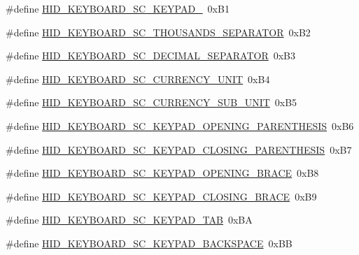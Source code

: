 \begin{DoxyCompactItemize}
\item 
\#define \hyperlink{group__Group__USBClassHIDCommon_ga694fa07e8f7188baef070de3aab4d86e}{H\+I\+D\+\_\+\+K\+E\+Y\+B\+O\+A\+R\+D\+\_\+\+S\+C\+\_\+\+K\+E\+Y\+P\+A\+D\+\_}~0x\+B1
\item 
\#define \hyperlink{group__Group__USBClassHIDCommon_gac6f7e2544c7742d3019f0f5a4cdfc398}{H\+I\+D\+\_\+\+K\+E\+Y\+B\+O\+A\+R\+D\+\_\+\+S\+C\+\_\+\+T\+H\+O\+U\+S\+A\+N\+D\+S\+\_\+\+S\+E\+P\+A\+R\+A\+T\+OR}~0x\+B2
\item 
\#define \hyperlink{group__Group__USBClassHIDCommon_gabd7bf746f597db6306eefb131a3a6b7b}{H\+I\+D\+\_\+\+K\+E\+Y\+B\+O\+A\+R\+D\+\_\+\+S\+C\+\_\+\+D\+E\+C\+I\+M\+A\+L\+\_\+\+S\+E\+P\+A\+R\+A\+T\+OR}~0x\+B3
\item 
\#define \hyperlink{group__Group__USBClassHIDCommon_ga4c3ec6b6de28e6829acfada9655a65df}{H\+I\+D\+\_\+\+K\+E\+Y\+B\+O\+A\+R\+D\+\_\+\+S\+C\+\_\+\+C\+U\+R\+R\+E\+N\+C\+Y\+\_\+\+U\+N\+IT}~0x\+B4
\item 
\#define \hyperlink{group__Group__USBClassHIDCommon_ga1c6e7384cc4f88cd4a83010dcc693c2e}{H\+I\+D\+\_\+\+K\+E\+Y\+B\+O\+A\+R\+D\+\_\+\+S\+C\+\_\+\+C\+U\+R\+R\+E\+N\+C\+Y\+\_\+\+S\+U\+B\+\_\+\+U\+N\+IT}~0x\+B5
\item 
\#define \hyperlink{group__Group__USBClassHIDCommon_ga473eda065f3fdcf8ab43b74a7a20959e}{H\+I\+D\+\_\+\+K\+E\+Y\+B\+O\+A\+R\+D\+\_\+\+S\+C\+\_\+\+K\+E\+Y\+P\+A\+D\+\_\+\+O\+P\+E\+N\+I\+N\+G\+\_\+\+P\+A\+R\+E\+N\+T\+H\+E\+S\+IS}~0x\+B6
\item 
\#define \hyperlink{group__Group__USBClassHIDCommon_gad89f62ff3bf4779add8420a62c61b1ff}{H\+I\+D\+\_\+\+K\+E\+Y\+B\+O\+A\+R\+D\+\_\+\+S\+C\+\_\+\+K\+E\+Y\+P\+A\+D\+\_\+\+C\+L\+O\+S\+I\+N\+G\+\_\+\+P\+A\+R\+E\+N\+T\+H\+E\+S\+IS}~0x\+B7
\item 
\#define \hyperlink{group__Group__USBClassHIDCommon_ga4f79fb23c74246a9ecfe6346d40e0580}{H\+I\+D\+\_\+\+K\+E\+Y\+B\+O\+A\+R\+D\+\_\+\+S\+C\+\_\+\+K\+E\+Y\+P\+A\+D\+\_\+\+O\+P\+E\+N\+I\+N\+G\+\_\+\+B\+R\+A\+CE}~0x\+B8
\item 
\#define \hyperlink{group__Group__USBClassHIDCommon_ga9cbbb6eb7dacbfc1287798d0aa3efb26}{H\+I\+D\+\_\+\+K\+E\+Y\+B\+O\+A\+R\+D\+\_\+\+S\+C\+\_\+\+K\+E\+Y\+P\+A\+D\+\_\+\+C\+L\+O\+S\+I\+N\+G\+\_\+\+B\+R\+A\+CE}~0x\+B9
\item 
\#define \hyperlink{group__Group__USBClassHIDCommon_ga8696e25da0f4caad9cf4609f63617b93}{H\+I\+D\+\_\+\+K\+E\+Y\+B\+O\+A\+R\+D\+\_\+\+S\+C\+\_\+\+K\+E\+Y\+P\+A\+D\+\_\+\+T\+AB}~0x\+BA
\item 
\#define \hyperlink{group__Group__USBClassHIDCommon_gaec967f45a2c9f0fd6b146853b1155507}{H\+I\+D\+\_\+\+K\+E\+Y\+B\+O\+A\+R\+D\+\_\+\+S\+C\+\_\+\+K\+E\+Y\+P\+A\+D\+\_\+\+B\+A\+C\+K\+S\+P\+A\+CE}~0x\+BB

\end{DoxyCompactItemize}
